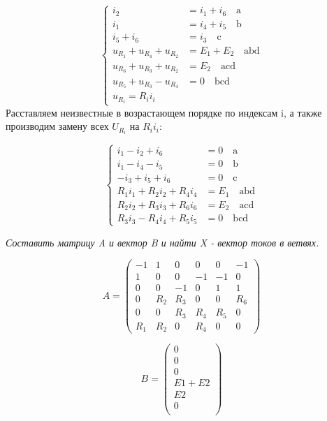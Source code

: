 \[
\left\{
\begin{aligned}
    i_2 &= i_1 + i_6 \quad \text{a} \\
    i_1 &= i_4 + i_5 \quad \text{b} \\
    i_5 + i_6 &= i_3 \quad \text{c} \\
    u_{R_1} + u_{R_4} + u_{R_2} &= E_1+E_2 \quad \text{abd} \\
    u_{R_6} + u_{R_3} + u_{R_2} &= E_2 \quad \text{acd} \\
    u_{R_5} + u_{R_3} - u_{R_4} &= 0 \quad \text{bcd} \\
    u_{R_i} = R_i i_i
\end{aligned}
\right.
\]
Расставляем неизвестные в возрастающем порядке по индексам i, а также производим замену всех $U_{R_i}$ на $R_i i_i$:

\[
\left\{
\begin{aligned}
    i_1-i_2+i_6 &= 0 \quad \text{a} \\
    i_1-i_4-i_5 &= 0 \quad \text{b} \\
    -i_3+i_5+i_6 &= 0 \quad \text{c} \\
    R_1 i_1 + R_2 i_2 + R_4 i_4 &= E_1 \quad \text{abd} \\
    R_2 i_2 + R_3 i_3 + R_6 i_6 &= E_2 \quad \text{acd} \\
    R_3 i_3 - R_4 i_4 + R_5 i_5 &= 0 \quad \text{bcd}
\end{aligned}
\right.
\]


\textit{Составить матрицу A и вектор B и найти X - вектор токов в ветвях.}

$$A = \begin{pmatrix}
-1 &  1 &  0 &  0 &  0 & -1 \\
 1 &  0 &  0 & -1 & -1 &  0 \\
 0 &  0 & -1 &  0 &  1 &  1 \\
 0 & R_2 & R_3 &  0 &  0 & R_6 \\
 0 &  0 & R_3 & R_4 & R_5 &  0 \\
R_1 & R_2 &  0 & R_4 &  0 &  0
\end{pmatrix}$$

$$B = \begin{pmatrix}
0 \\
0 \\
0 \\
E1+E2 \\
E2 \\
0 \\
\end{pmatrix}$$

